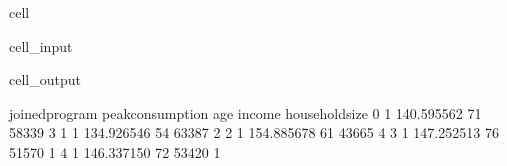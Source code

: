 \documentclass[letterpaper,10pt,english]{jupyterBook}
\begin{document}
\begin{sphinxuseclass}{cell}
\begin{sphinxVerbatimInput}
\begin{sphinxuseclass}{cell_input}
\begin{sphinxVerbatim}[commandchars=\\\{\}]
                  

  
     
     
     
     
     


\end{sphinxVerbatim}

\end{sphinxuseclass}\end{sphinxVerbatimInput}
\begin{sphinxVerbatimOutput}

\begin{sphinxuseclass}{cell_output}
\begin{sphinxVerbatim}[commandchars=\\\{\}]
   joined\PYGZus{}program  peak\PYGZus{}consumption  age  income  household\PYGZus{}size
0               1        140.595562   71   58339               3
1               1        134.926546   54   63387               2
2               1        154.885678   61   43665               4
3               1        147.252513   76   51570               1
4               1        146.337150   72   53420               1
\end{sphinxVerbatim}

\end{sphinxuseclass}\end{sphinxVerbatimOutput}

\end{sphinxuseclass}
\end{document}
